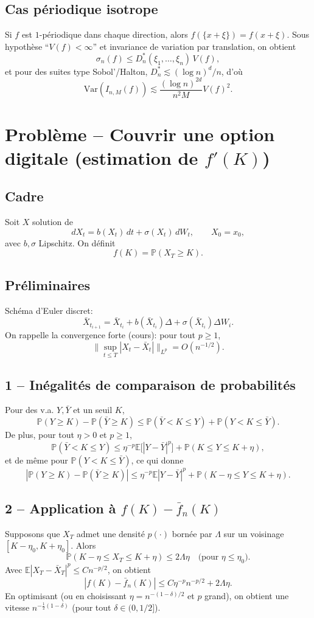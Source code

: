 \documentclass[11pt,a4paper]{article}
\newcommand{\E}{\mathbb{E}}
\newcommand{\Pp}{\mathbb{P}}
\newcommand{\1}{\mathbbm{1}}
\newcommand{\Var}{\mathrm{Var}}
\theoremstyle{plain}
\theoremstyle{definition}
\begin{document}
\subsection{Cas périodique isotrope}
Si $f$ est $1$-périodique dans chaque direction, alors $f(\{x+\xi\})=f(x+\xi)$. Sous hypothèse ``$V(f)<\infty$'' et invariance de variation par translation, on obtient
\[
\sigma_n(f)\le D_n^*(\xi_1,\dots,\xi_n)\,V(f),
\]
et pour des suites type Sobol'/Halton, $D_n^*\lesssim (\log n)^d/n$, d'où
\[
\Var(\widehat I_{n,M}(f))\lesssim \frac{(\log n)^{2d}}{n^2M}V(f)^2.
\]

\section{Problème -- Couvrir une option digitale (estimation de $f'(K)$)}
\subsection{Cadre}
Soit $X$ solution de
\[
dX_t=b(X_t)\,dt+\sigma(X_t)\,dW_t,\qquad X_0=x_0,
\]
avec $b,\sigma$ Lipschitz. On définit
\[
f(K)=\Pp(X_T\ge K).
\]
\subsection{Préliminaires}
Schéma d'Euler discret:
\[
\bar X_{t_{i+1}}=\bar X_{t_i}+b(\bar X_{t_i})\Delta+\sigma(\bar X_{t_i})\Delta W_i.
\]
On rappelle la convergence forte (cours): pour tout $p\ge 1$,
\[
\Big\|\sup_{t\le T}|X_t-\bar X_t|\Big\|_{L^p}=O(n^{-1/2}).
\]

\subsection{1 -- Inégalités de comparaison de probabilités}
Pour des v.a. $Y,\bar Y$ et un seuil $K$,
\[
\Pp(Y\ge K)-\Pp(\bar Y\ge K)\le \Pp(\bar Y<K\le Y)+\Pp(Y<K\le \bar Y).
\]
De plus, pour tout $\eta>0$ et $p\ge 1$,
\[
\Pp(\bar Y<K\le Y)\le \eta^{-p}\E\big[|Y-\bar Y|^p\big]+\Pp(K\le Y\le K+\eta),
\]
et de même pour $\Pp(Y<K\le \bar Y)$, ce qui donne
\[
|\Pp(Y\ge K)-\Pp(\bar Y\ge K)|
\le \eta^{-p}\E|Y-\bar Y|^p+\Pp(K-\eta\le Y\le K+\eta).
\]

\subsection{2 -- Application à $f(K)-\bar f_n(K)$}
Supposons que $X_T$ admet une densité $p(\cdot)$ bornée par $\Lambda$ sur un voisinage $[K-\eta_0,K+\eta_0]$. Alors
\[
\Pp(K-\eta\le X_T\le K+\eta)\le 2\Lambda\eta
\quad\text{(pour }\eta\le\eta_0\text{).}
\]
Avec $\E|X_T-\bar X_T|^p\le C n^{-p/2}$, on obtient
\[
|f(K)-\bar f_n(K)|\le C\eta^{-p}n^{-p/2}+2\Lambda\eta.
\]
En optimisant (ou en choisissant $\eta=n^{-(1-\delta)/2}$ et $p$ grand), on obtient une vitesse $n^{-\frac12(1-\delta)}$ (pour tout $\delta\in(0,1/2]$).
\end{document}
